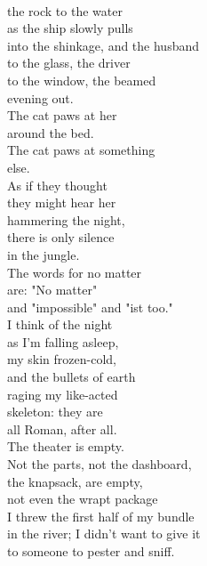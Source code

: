\documentclass[smalldemyvopaper,11pt,twoside,onecolumn,openright,extrafontsizes]{memoir}
\begin{document}
\\the rock to the water
\\as the ship slowly pulls
\\into the shinkage, and the husband
\\to the glass, the driver
\\to the window, the beamed
\\evening out.
\\The cat paws at her
\\around the bed.
\\The cat paws at something
\\else.
\\As if they thought
\\they might hear her
\\hammering the night,
\\there is only silence
\\in the jungle.
\\The words for no matter
\\are: "No matter"
\\and "impossible" and "ist too."
\\I think of the night
\\as I'm falling asleep,
\\my skin frozen-cold,
\\and the bullets of earth
\\raging my like-acted
\\skeleton: they are
\\all Roman, after all.
\\The theater is empty.
\\Not the parts, not the dashboard,
\\the knapsack, are empty,
\\not even the wrapt package
\\I threw the first half of my bundle
\\in the river; I didn't want to give it
\\to someone to pester and sniff.
\end{document}
